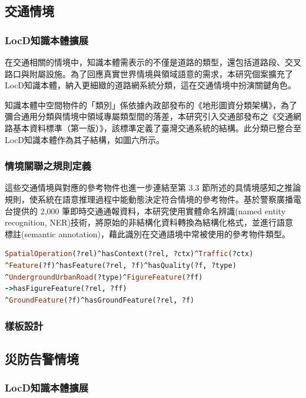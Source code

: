 \subsection{交通情境}

\subsubsection{LocD知識本體擴展}

在交通相關的情境中，知識本體需表示的不僅是道路的類型，還包括道路段、交叉路口與附屬設施。為了回應真實世界情境與領域語意的需求，本研究個案擴充了LocD知識本體，納入更細緻的道路網系統分類，這在交通情境中扮演關鍵角色。

知識本體中空間物件的「類別」係依據內政部發布的《地形圖資分類架構》，為了彌合通用分類與情境中領域專屬類型間的落差，本研究引入交通部發布之《交通網路基本資料標準（第一版）》，該標準定義了臺灣交通系統的結構。此分類已整合至LocD知識本體作為其子結構，如圖六所示。

\subsubsection{情境關聯之規則定義}

這些交通情境與對應的參考物件也進一步連結至第 3.3 節所述的具情境感知之推論規則，使系統在語意推理過程中能動態決定符合情境的參考物件。基於警察廣播電台提供的 2,000 筆即時交通通報資料，本研究使用實體命名辨識(named entity recognition, NER)技術，將原始的非結構化資料轉換為結構化格式，並進行語意標註(semantic annotation)，藉此識別在交通語境中常被使用的參考物件類型。

\begin{lstlisting}[language=Prolog, basicstyle=\ttfamily, xleftmargin=2em]
SpatialOperation(?rel)^hasContext(?rel, ?ctx)^Traffic(?ctx)
^Feature(?f)^hasFeature(?rel, ?f)^hasQuality(?f, ?type)
^UndergroundUrbanRoad(?type)^FigureFeature(?ff) 
->hasFigureFeature(?rel, ?ff)
^GroundFeature(?f)^hasGroundFeature(?rel, ?f)
\end{lstlisting}

\subsubsection{樣板設計}

\subsection{災防告警情境}

\subsubsection{LocD知識本體擴展}

